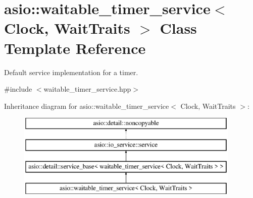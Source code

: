 \hypertarget{classasio_1_1waitable__timer__service}{}\section{asio\+:\+:waitable\+\_\+timer\+\_\+service$<$ Clock, Wait\+Traits $>$ Class Template Reference}
\label{classasio_1_1waitable__timer__service}


Default service implementation for a timer.  




{\ttfamily \#include $<$waitable\+\_\+timer\+\_\+service.\+hpp$>$}

Inheritance diagram for asio\+:\+:waitable\+\_\+timer\+\_\+service$<$ Clock, Wait\+Traits $>$\+:\begin{figure}[H]
\begin{center}
\leavevmode
\includegraphics[height=4.000000cm]{classasio_1_1waitable__timer__service}
\end{center}
\end{figure}
